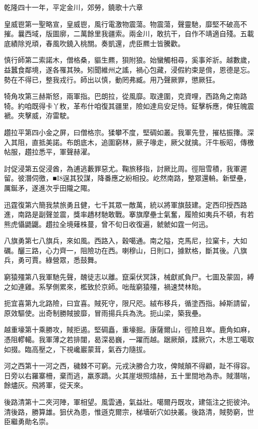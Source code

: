 \begin{pinyinscope}
乾隆四十一年，平定金川，郊勞，鐃歌十六章

皇威鬯第一聖略宣，皇威鬯，風行電激物震蕩。物震蕩，聲靈馳，靡堅不破高不摧。曩西域，版圖廓，二萬餘里我疆索。兩金川，敢抗干，自作不靖適自殘。五載底績除兇頑，春風吹鐃入桃關。奏凱還，虎臣羆士皆騰歡。

慎行師第二索諾木，僧格桑，貙生羆，狽附狼。始蠻觸相尋，奚事斧斨。越數歲，益蠶食鄰境，遂各罹其殃。矧聞維州之謠，禍心包藏，浸假約束是偝，恩德是忘。勢在不得已，整我戎行。師出以慎，動罔弗臧。用乃聲厥罪，懲厥狂。

犄角攻第三赫斯怒，兩軍指。巴朗拉，從風靡。取達圍，克資哩，西路角之南路犄。約咱既得卡丫敉，革布什咱復其疆里，險如達烏安足恃。鉦擊柝應，俾狂魄震褫。夾擊威，洊雷駛。

趲拉平第四小金之屏，曰僧格宗。猱攀不度，堅碉如叢。我軍先登，摧枯振籜。深入其阻，直抵美諾。布朗底木，追圍窮林，厥子喙走，厥父就擒。汗牛板昭，傳檄帖服，趲拉悉平，軍聲赫濯。

討促浸第五促浸酋，為逋逃藪罪惡尤。鞠旅移指，討厥比周。徑阻雪積，我軍遲留。彼潛伺徼，■I8逞其狡謀，降番應之紛相投。屹然南路，整眾還輈。新壁壘，厲鋋矛，遂進次乎田隴之陬。

迅霆復第六簡我禁旅勇且健，七千其眾一敵萬，統以將軍旗鼓建。定西印授西路進，南路是副聲並震，獎率趫材馳敢戰。搴旗摩壘士氣奮，履險如夷兵不頓，有若熊虎懾鼯鼴。趲拉全境薙株蔓，曾不旬日收復遍，虩虩如霆一何迅。

八旗勇第七八旗兵，來如風。西路入，穀噶通。南之隘，克馬尼，拉窠卡，大如礪。釃三路，心力齊一，阻險功在西。喇穆山，日則口，據默格，斷其後。八旗兵，勇可賈。綠營眾，悉鼓舞。

窮猿殭第八我軍馳先聲，醜徒志以離。竄渠伏冥誅，械獻貳負尸。七圖及蒙固，縛之如連雞。系孥側累來，檻致於京師。咄哉窮猿殭，禍速焚林貽。

扼宜喜第九北路險，曰宜喜。賊死守，限尺咫。絨布移兵，循塗西指。綽斯請留，原效驅使。出奇制勝賊披靡，冒雨揚兵兵為洗。扼山梁，築我壘。

越重壕第十乘勝攻，賊拒遏。堅碉矗，重壕掘。康薩爾山，徑險且崒。鹿角如麻，憑阻轇轕。我軍薄之若排闥，曷深曷巍，一躍而越。踞厥顛，蹂厥穴，木思工噶取如掇。臨高壓之，下視巉巖蒙茸，氣吞力隨拔。

河之西第十一河之西，穢棘不可窮。元戎決勝合力攻，俾賊顛不得顧，趾不得容。日旁以右羅寨柵，棄而逃，羸豕蹢。火其崖垠照熻赫，五十里間地為赤。賊潛喘，餘燼灰。飛將軍，從天來。

後路清第十二夾河陣，軍相望。風雲通，氣益壯。噶爾丹既攻，建瓴注之扼彼沖。清後路，勝算雄。狙伏為患，惟遜克爾宗，梯墻斫穴如抉叢。後路清，賊勢窮，世臣繼勇勛名崇。


\end{pinyinscope}

